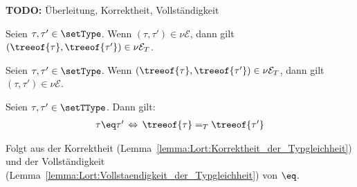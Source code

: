 {\bf TODO:} \"Uberleitung, Korrektheit, Vollst\"andigkeit

\begin{lemma}[Korrekheit] \label{lemma:Lort:Korrektheit_der_Typgleichheit}
  Seien $\tau,\tau'\in\setType$. Wenn $(\tau,\tau')\in \nu\mathcal{E}$, dann gilt
  $(\treeof{\tau},\treeof{\tau'})\in \nu\mathcal{E}_T$.
\end{lemma}

\begin{lemma} \label{lemma:Lort:Vollstaendigkeit_der_Typgleichheit}
  Seien $\tau,\tau'\in\setType$. Wenn $(\treeof{\tau},\treeof{\tau'})\in\nu\mathcal{E}_T$,
  dann gilt $(\tau,\tau')\in \nu\mathcal{E}$.
\end{lemma}

\begin{satz}
  Seien $\tau,\tau' \in \setTType$. Dann gilt:
  \[\begin{array}{l}
    \tau \eq \tau'\,\Leftrightarrow\,\treeof{\tau} =_T \treeof{\tau'}
  \end{array}\]
\end{satz}

\begin{beweis}
  Folgt aus der Korrektheit (Lemma~\ref{lemma:Lort:Korrektheit_der_Typgleichheit}) und der
  Vollst\"andigkeit (Lemma~\ref{lemma:Lort:Vollstaendigkeit_der_Typgleichheit}) von $\eq$.
\end{beweis}


